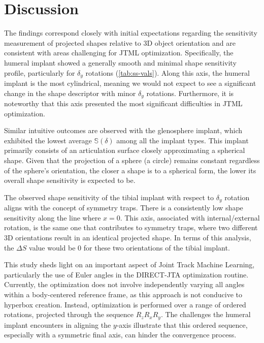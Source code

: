 \section{Discussion}
The findings correspond closely with initial expectations regarding the sensitivity measurement of projected shapes relative to 3D object orientation and are consistent with areas challenging for JTML optimization.
Specifically, the humeral implant showed a generally smooth and minimal shape sensitivity profile, particularly for $\delta_{y}$ rotations (\cref{tab:ss-vals}).
Along this axis, the humeral implant is the most cylindrical, meaning we would not expect to see a significant change in the shape descriptor with minor $\delta_{y}$ rotations.
Furthermore, it is noteworthy that this axis presented the most significant difficulties in JTML optimization.

Similar intuitive outcomes are observed with the glenosphere implant, which exhibited the lowest average $\mathbb{S}(\delta)$ among all the implant types.
This implant primarily consists of an articulation surface closely approximating a spherical shape.
Given that the projection of a sphere (a circle) remains constant regardless of the sphere's orientation, the closer a shape is to a spherical form, the lower its overall shape sensitivity is expected to be.

The observed shape sensitivity of the tibial implant with respect to $\delta_{y}$ rotation aligns with the concept of symmetry traps.
There is a consistently low shape sensitivity along the line where $x=0$.
This axis, associated with internal/external rotation, is the same one that contributes to symmetry traps, where two different 3D orientations result in an identical projected shape.
In terms of this analysis, the $\Delta S$ value would be $0$ for these two orientations of the tibial implant.

This study sheds light on an important aspect of Joint Track Machine Learning, particularly the use of Euler angles in the DIRECT-JTA optimization routine.
Currently, the optimization does not involve independently varying all angles within a body-centered reference frame, as this approach is not conducive to hyperbox creation.
Instead, optimization is performed over a range of ordered rotations, projected through the sequence $R_{z}R_{x}R_{y}$.
The challenges the humeral implant encounters in aligning the $y$-axis illustrate that this ordered sequence, especially with a symmetric final axis, can hinder the convergence process.

